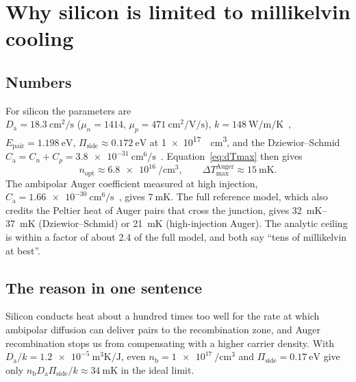 \documentclass[11pt,a4paper]{article}
\newcommand{\Ep}{E_{\mathrm{pair}}}
\newcommand{\Da}{D_{\mathrm{a}}}
\newcommand{\Ca}{C_{\mathrm{a}}}
\newcommand{\nb}{n_{\mathrm{b}}}
\newcommand{\Pis}{\Pi_{\mathrm{side}}}
\begin{document}
\section{Why silicon is limited to millikelvin cooling}\label{sec:silicon}

\subsection{Numbers}
For silicon the parameters are\\ $\Da=\SI{18.3}{\centi\metre\squared\per\second}$ ($\mu_n=1414$, $\mu_p=\SI{471}{\centi\metre\squared\per\volt\per\second}$), $k=\SI{148}{\watt\per\metre\per\kelvin}$~\cite{glassbrenner}, $\Ep=\SI{1.198}{\electronvolt}$, $\Pis\approx\SI{0.172}{\electronvolt}$ at \SI{1e17}{\per\centi\metre\cubed}, and the Dziewior--Schmid $\Ca=C_n+C_p=\SI{3.8e-31}{\centi\metre\tothe{6}\per\second}$~\cite{dziewior}. Equation~\eqref{eq:dTmax} then gives
\begin{equation}
 n_{\mathrm{opt}}\approx\SI{6.8e16}{\per\centi\metre\cubed},\qquad \Delta T_{\max}^{\mathrm{Auger}}\approx\SI{15}{\milli\kelvin}.
\end{equation}
The ambipolar Auger coefficient measured at high injection, $\Ca=\SI{1.66e-30}{\centi\metre\tothe{6}\per\second}$~\cite{sinton}, gives $\SI{7}{\milli\kelvin}$. The full reference model, which also credits the Peltier heat of Auger pairs that cross the junction, gives \SIrange{32}{37}{\milli\kelvin} (Dziewior--Schmid) or \SI{21}{\milli\kelvin} (high-injection Auger). The analytic ceiling is within a factor of about 2.4 of the full model, and both say ``tens of millikelvin at best''.

\subsection{The reason in one sentence}
\begin{keyresult}
Silicon conducts heat about a hundred times too well for the rate at which ambipolar diffusion can deliver pairs to the recombination zone, and Auger recombination stops us from compensating with a higher carrier density. With $\Da/k=\SI{1.2e-5}{\metre\cubed\kelvin\per\joule}$, even $\nb=\SI{1e17}{\per\centi\metre\cubed}$ and $\Pis=\SI{0.17}{\electronvolt}$ give only $\nb\Da\Pis/k\approx\SI{34}{\milli\kelvin}$ in the ideal limit.
\end{keyresult}
\end{document}
